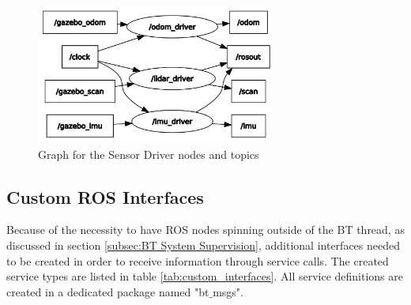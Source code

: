 \begin{figure}[ht]
	\centering
	\includegraphics[width=0.7\textwidth]{images/rqt_graph_sensor_drivers.png}
	\caption{Graph for the Sensor Driver nodes and topics}
	\label{fig:rqt_graph}
\end{figure}

\subsection{Custom ROS Interfaces}

Because of the necessity to have ROS nodes spinning outside of the BT thread, as discussed in section \ref{subsec:BT System Supervision}, additional interfaces needed to be created in order to receive information through service calls. The created service types are listed in table \ref{tab:custom_interfaces}. All service definitions are created in a dedicated package named "bt$\_$msgs". 

\begin{table}[ht]
	\centering
	\caption{Implemented Custom Services}
	\label{tab:custom_interfaces}
	\renewcommand{\arraystretch}{1.5}
\end{table}
